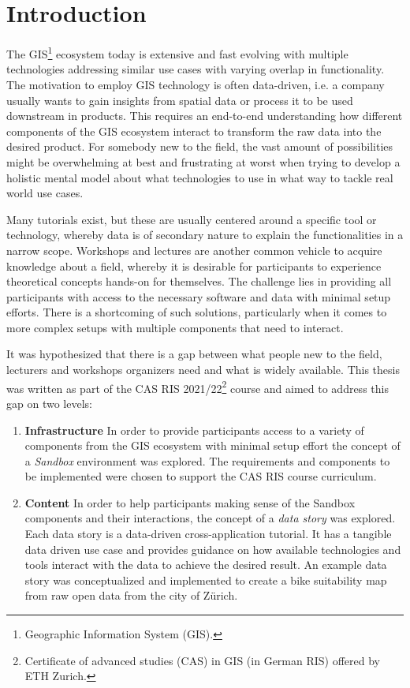 \documentclass[11pt, a4paper, oneside, parskip=full-]{scrartcl}
\begin{document}
\newpage
{}
\setcounter{page}{1}
\section{Introduction}

The GIS\footnote{Geographic Information System (GIS).} ecosystem today is
extensive and fast evolving with multiple technologies addressing similar use
cases with varying overlap in functionality. The motivation to employ GIS
technology is often data-driven, i.e. a company usually wants to gain insights
from spatial data or process it to be used downstream in products. This requires
an end-to-end understanding how different components of the GIS ecosystem
interact to transform the raw data into the desired product. For somebody new to
the field, the vast amount of possibilities might be overwhelming at best and
frustrating at worst when trying to develop a holistic mental model about what
technologies to use in what way to tackle real world use cases.

Many tutorials exist, but these are usually centered around a specific tool or
technology, whereby data is of secondary nature to explain the functionalities
in a narrow scope. Workshops and lectures are another common vehicle to acquire
knowledge about a field, whereby it is desirable for participants to experience
theoretical concepts hands-on for themselves. The challenge lies in providing
all participants with access to the necessary software and data with minimal
setup efforts. There is a shortcoming of such solutions, particularly when it
comes to more complex setups with multiple components that need to interact.

It was hypothesized that there is a gap between what people new to the field,
lecturers and workshops organizers need and what is widely available. This
thesis was written as part of the CAS RIS 2021/22\footnote{Certificate of
advanced studies (CAS) in GIS (in German RIS) offered by ETH Zurich.} course and
aimed to address this gap on two levels:
\begin{enumerate}
  \item \textbf{Infrastructure} In order to provide participants access to a
  variety of components from the GIS ecosystem with minimal setup effort the
  concept of a \emph{Sandbox} environment was explored. The requirements and
  components to be implemented were chosen to support the CAS RIS course
  curriculum.
  \item \textbf{Content} In order to help participants making sense of the
  Sandbox components and their interactions, the concept of a \emph{data story}
  was explored. Each data story is a data-driven cross-application tutorial. It
  has a tangible data driven use case and provides guidance on how available
  technologies and tools interact with the data to achieve the desired result.
  An example data story was conceptualized and implemented to create a bike
  suitability map from raw open data from the city of Zürich.
\end{enumerate}
\end{document}
